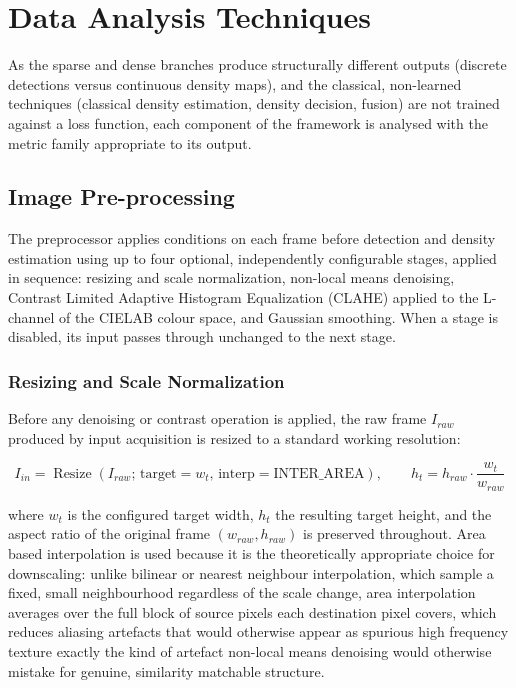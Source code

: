 \section{Data Analysis Techniques}
\label{sec:analysis-techniques}

As the sparse and dense branches produce structurally different outputs (discrete detections versus continuous density maps), and the classical, non-learned techniques (classical density estimation, density decision, fusion) are not trained against a loss function, each component of the framework is analysed with the metric family appropriate to its output.

\subsection{Image Pre-processing}

The preprocessor applies conditions on each frame before detection and density estimation using up to four optional, independently configurable stages, applied in sequence: resizing and scale normalization, non-local means denoising, Contrast Limited Adaptive Histogram Equalization (CLAHE) applied to the L-channel of the CIELAB colour space, and Gaussian smoothing. When a stage is disabled, its input passes through unchanged to the next stage.

\subsubsection{Resizing and Scale Normalization}

Before any denoising or contrast operation is applied, the raw frame $I_{raw}$ produced by input acquisition is resized to a standard working resolution:

\begin{equation}
	I_{in} = \operatorname{Resize}\left(I_{raw};\, \text{target}=w_{t},\, \text{interp}=\text{INTER\_AREA}\right), \qquad h_{t} = h_{raw} \cdot \frac{w_{t}}{w_{raw}}
	\label{eq:resize}
\end{equation}

where $w_t$ is the configured target width, $h_t$ the resulting target height, and the aspect ratio of the original frame $(w_{raw}, h_{raw})$ is preserved throughout. Area based interpolation is used because it is the theoretically appropriate choice for downscaling: unlike bilinear or nearest neighbour interpolation, which sample a fixed, small neighbourhood regardless of the scale change, area interpolation averages over the full block of source pixels each destination pixel covers, which reduces aliasing artefacts that would otherwise appear as spurious high frequency texture exactly the kind of artefact non-local means denoising would otherwise mistake for genuine, similarity matchable structure.

